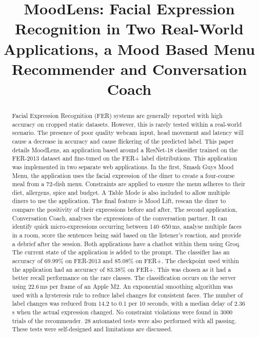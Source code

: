 \documentclass[conference]{IEEEtran}
\begin{document}
\title{MoodLens: Facial Expression Recognition in Two Real-World Applications, a Mood Based Menu Recommender and Conversation Coach}

\author{
\and
{}
}

\maketitle

\begin{abstract}
Facial Expression Recognition (FER) systems are generally reported with high accuracy on cropped static datasets. However, this is rarely tested within a real-world scenario. The presence of poor quality webcam input, head movement and latency will cause a decrease in accuracy and cause flickering of the predicted label. This paper details MoodLens, an application based around a ResNet-18 classifier trained on the FER-2013 dataset and fine-tuned on the FER+ label distributions. This application was implemented in two separate web applications. In the first, Smash Guys Mood Menu, the application uses the facial expression of the diner to create a four-course meal from a 72-dish menu. Constraints are applied to ensure the menu adheres to their diet, allergens, spice and budget. A Table Mode is also included to allow multiple diners to use the application. The final feature is Mood Lift, rescan the diner to compare the positivity of their expressions before and after. The second application, Conversation Coach, analyses the expressions of the conversation partner. It can identify quick micro-expressions occurring between 140--650\,ms, analyse multiple faces in a room, score the sentences being said based on the listener's reaction, and provide a debrief after the session. Both applications have a chatbot within them using Groq. The current state of the application is added to the prompt. The classifier has an accuracy of 69.99\% on FER-2013 and 85.08\% on FER+. The checkpoint used within the application had an accuracy of 83.38\% on FER+. This was chosen as it had a better recall performance on the rare classes. The classification occurs on the server using 22.6\,ms per frame of an Apple M2. An exponential smoothing algorithm was used with a hysteresis rule to reduce label changes for consistent faces. The number of label changes was reduced from 14.2 to 0.1 per 10 seconds, with a median delay of 2.36\,s when the actual expression changed. No constraint violations were found in 3000 trials of the recommender. 28 automated tests were also performed with all passing. These tests were self-designed and limitations are discussed.
\end{abstract}
\end{document}

